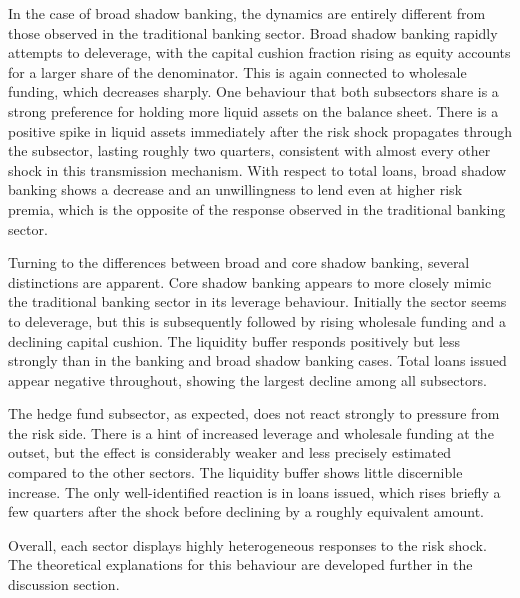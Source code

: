 \documentclass[12pt,a4paper]{report}
\begin{document}
In the case of broad shadow banking, the dynamics are entirely different from those observed in the traditional banking sector. Broad shadow banking rapidly attempts to deleverage, with the capital cushion fraction rising as equity accounts for a larger share of the denominator. This is again connected to wholesale funding, which decreases sharply. One behaviour that both subsectors share is a strong preference for holding more liquid assets on the balance sheet. There is a positive spike in liquid assets immediately after the risk shock propagates through the subsector, lasting roughly two quarters, consistent with almost every other shock in this transmission mechanism. With respect to total loans, broad shadow banking shows a decrease and an unwillingness to lend even at higher risk premia, which is the opposite of the response observed in the traditional banking sector.

Turning to the differences between broad and core shadow banking, several distinctions are apparent. Core shadow banking appears to more closely mimic the traditional banking sector in its leverage behaviour. Initially the sector seems to deleverage, but this is subsequently followed by rising wholesale funding and a declining capital cushion. The liquidity buffer responds positively but less strongly than in the banking and broad shadow banking cases. Total loans issued appear negative throughout, showing the largest decline among all subsectors.  

The hedge fund subsector, as expected, does not react strongly to pressure from the risk side. There is a hint of increased leverage and wholesale funding at the outset, but the effect is considerably weaker and less precisely estimated compared to the other sectors. The liquidity buffer shows little discernible increase. The only well-identified reaction is in loans issued, which rises briefly a few quarters after the shock before declining by a roughly equivalent amount.

Overall, each sector displays highly heterogeneous responses to the risk shock. The theoretical explanations for this behaviour are developed further in the discussion section.


\end{document}
